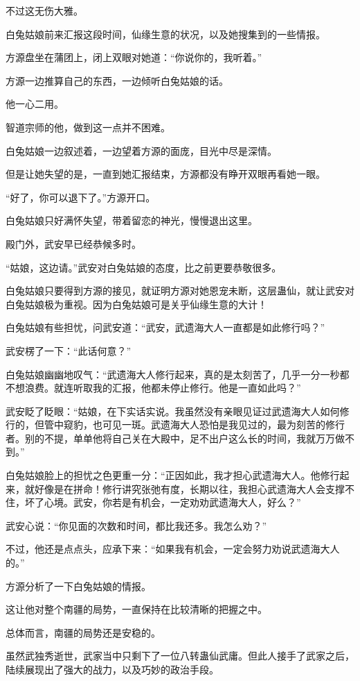 \begin{this_body}
不过这无伤大雅。

白兔姑娘前来汇报这段时间，仙缘生意的状况，以及她搜集到的一些情报。

方源盘坐在蒲团上，闭上双眼对她道：“你说你的，我听着。”

方源一边推算自己的东西，一边倾听白兔姑娘的话。

他一心二用。

智道宗师的他，做到这一点并不困难。

白兔姑娘一边叙述着，一边望着方源的面庞，目光中尽是深情。

但是让她失望的是，一直到她汇报结束，方源都没有睁开双眼再看她一眼。

“好了，你可以退下了。”方源开口。

白兔姑娘只好满怀失望，带着留恋的神光，慢慢退出这里。

殿门外，武安早已经恭候多时。

“姑娘，这边请。”武安对白兔姑娘的态度，比之前更要恭敬很多。

白兔姑娘只要得到方源的接见，就证明方源对她恩宠未断，这层蛊仙，就让武安对白兔姑娘极为重视。因为白兔姑娘可是关乎仙缘生意的大计！

白兔姑娘有些担忧，问武安道：“武安，武遗海大人一直都是如此修行吗？”

武安楞了一下：“此话何意？”

白兔姑娘幽幽地叹气：“武遗海大人修行起来，真的是太刻苦了，几乎一分一秒都不想浪费。就连听取我的汇报，他都未停止修行。他是一直如此吗？”

武安眨了眨眼：“姑娘，在下实话实说。我虽然没有亲眼见证过武遗海大人如何修行的，但管中窥豹，也可见一斑。武遗海大人恐怕是我见过的，最为刻苦的修行者。别的不提，单单他将自己关在大殿中，足不出户这么长的时间，我就万万做不到。”

白兔姑娘脸上的担忧之色更重一分：“正因如此，我才担心武遗海大人。他修行起来，就好像是在拼命！修行讲究张弛有度，长期以往，我担心武遗海大人会支撑不住，坏了心境。武安，你若是有机会，一定劝劝武遗海大人，好么？”

武安心说：“你见面的次数和时间，都比我还多。我怎么劝？”

不过，他还是点点头，应承下来：“如果我有机会，一定会努力劝说武遗海大人的。”

方源分析了一下白兔姑娘的情报。

这让他对整个南疆的局势，一直保持在比较清晰的把握之中。

总体而言，南疆的局势还是安稳的。

虽然武独秀逝世，武家当中只剩下了一位八转蛊仙武庸。但此人接手了武家之后，陆续展现出了强大的战力，以及巧妙的政治手段。


\end{this_body}

